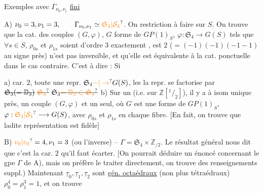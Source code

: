 Exemples avec $\Gamma_{\nu_0,\nu_1}$ \uline{fini}

A) $\nu_0=3,\nu_1=3,\qquad\Gamma_{\nu_0,\nu_1}\simeq\unsure{\mathfrak S_4|\mathcal S_4}$. On 
restriction à faire sur $S$. On trouve que la
cat. des couples $(G,\varphi)$, $G$ forme de $GP(1)_S$,
$\varphi:\mathfrak S_4\longrightarrow G(S)$ tels que $\forall s\in S$, $\rho_{0s}$ et $\rho_{1s}$ soient
d'ordre $3$ exactement , est 
$2$ ($=(-1)(-1)(-1-1)$ au signe près) n'est pas inversible,
 et qu'elle est équivalente à la cat. ponctuelle
dans le cas contraire. C'est à dire : Si

a)  car. $2$, toute une repr. $\mathfrak S_4\unsure{\mathbin{-}|\to}G(S)$, les
    la
repr. se factorise par $\deleted{\mathfrak S_3(=\mathbb D_3)}\ \deleted{\unsure{\mathfrak S_3}}\ \mathfrak S_3\deleted{\unsure{=\mathbb D_3\subset\mathfrak S_4}}$
b) Sur un  (i.e. sur $\mathbb Z[{}^1\!/_2]$), il
y a à isom unique près, un couple $(G,\varphi)$
et un seul, où $G$ est une forme de $GP(1)_S$,
$\varphi:\unsure{\mathfrak S_4|\mathcal S_4}\longrightarrow G(S)$, avec $\rho_{0s}$ et $\rho_{1s}$ 
en chaque fibre.  [En fait,  on trouve que
ladite représentation   est fidèle]

B) $\unsure{\nu_0|v_0}=4,\nu_1=3$ (ou l'inverse) -- 
$\Gamma=\mathfrak S_4\times\mathbb Z_{/2}$. Le résultat général nous dit que
c'est  la car. $2$ qu'il faut écarter. [On pourrait
déduire un énoncé concernant le gpe $\Gamma$ de
A), mais on préfère le traiter directement, on
trouve des renseignements suppl.) Maintenant $\underline{\tau}_0,\underline{\tau}_1,\underline{\tau}_2$
sont  \uline{gén. octaédraux} (non plus
tétraédraux)  $\rho_0^4=\rho_1^3=1$, et on
trouve

